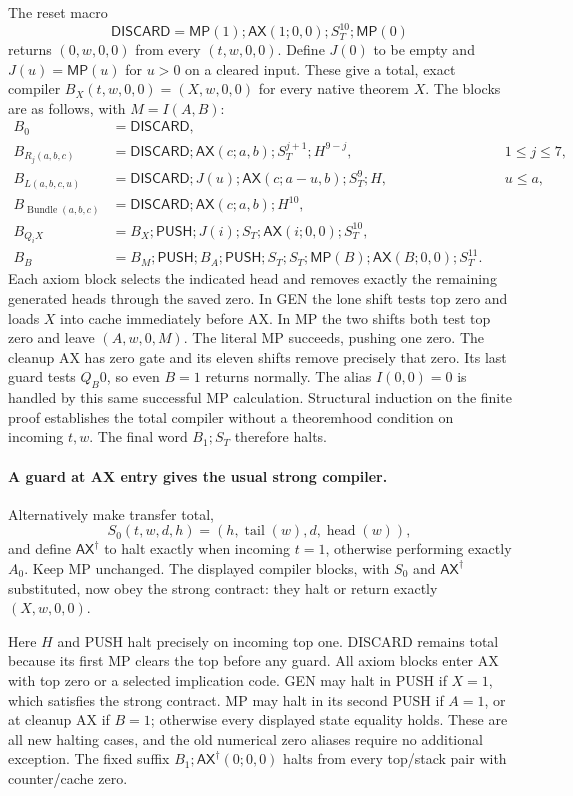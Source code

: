 The reset macro
\[
 \mathsf{DISCARD}=\mathsf{MP}(1);\mathsf{AX}(1;0,0);
 S_T^{10};\mathsf{MP}(0)
\]
returns $(0,w,0,0)$ from every $(t,w,0,0)$.  Define $J(0)$ to be empty
and $J(u)=\mathsf{MP}(u)$ for $u>0$ on a cleared input.  These give a
total, exact compiler $B_X(t,w,0,0)=(X,w,0,0)$ for every native theorem $X$.
The blocks are as follows, with $M=I(A,B)$:
\begin{align*}
 B_0&=\mathsf{DISCARD},\\
 B_{R_j(a,b,c)}&=\mathsf{DISCARD};\mathsf{AX}(c;a,b);
 S_T^{j+1};H^{9-j}, &&1\le j\le7,\\
 B_{L(a,b,c,u)}&=\mathsf{DISCARD};J(u);\mathsf{AX}(c;a-u,b);
 S_T^9;H, &&u\le a,\\
 B_{\operatorname{Bundle}(a,b,c)}&=
 \mathsf{DISCARD};\mathsf{AX}(c;a,b);H^{10},\\
 B_{Q_iX}&=B_X;\mathsf{PUSH};J(i);S_T;
 \mathsf{AX}(i;0,0);S_T^{10},\\
 B_B&=B_M;\mathsf{PUSH};B_A;\mathsf{PUSH};S_T;S_T;
 \mathsf{MP}(B);\mathsf{AX}(B;0,0);S_T^{11}.
\end{align*}
Each axiom block selects the indicated head and removes exactly the
remaining generated heads through the saved zero.  In GEN the lone shift
tests top zero and loads $X$ into cache immediately before AX.  In MP the
two shifts both test top zero and leave $(A,w,0,M)$.  The literal MP succeeds,
pushing one zero.  The cleanup AX has zero gate and its eleven shifts
remove precisely that zero.  Its last guard tests $Q_B0$, so even $B=1$
returns normally.  The alias $I(0,0)=0$ is handled by this same successful
MP calculation.  Structural induction on the finite proof establishes the
total compiler without a theoremhood condition on incoming $t,w$.
The final word $B_1;S_T$ therefore halts.

\paragraph{A guard at AX entry gives the usual strong compiler.}
Alternatively make transfer total,
\[
 S_0(t,w,d,h)=(h,\operatorname{tail}(w),d,\operatorname{head}(w)),
\]
and define $\mathsf{AX}^{\dagger}$ to halt exactly when incoming $t=1$,
otherwise performing exactly $A_0$.  Keep MP unchanged.  The displayed
compiler blocks, with $S_0$ and $\mathsf{AX}^{\dagger}$ substituted, now
obey the strong contract: they halt or return exactly $(X,w,0,0)$.

Here $H$ and PUSH halt precisely on incoming top one.  DISCARD remains
total because its first MP clears the top before any guard.  All axiom
blocks enter AX with top zero or a selected implication code.  GEN may
halt in PUSH if $X=1$, which satisfies the strong contract.  MP may halt
in its second PUSH if $A=1$, or at cleanup AX if $B=1$; otherwise every
displayed state equality holds.  These are all new halting cases, and the
old numerical zero aliases require no additional exception.  The fixed
suffix $B_1;\mathsf{AX}^{\dagger}(0;0,0)$ halts from every top/stack pair
with counter/cache zero.

